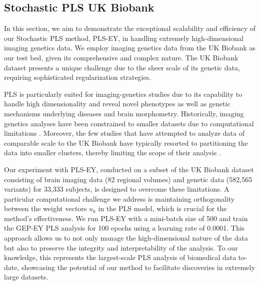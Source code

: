 \subsection{Stochastic PLS UK Biobank}
In this section, we aim to demonstrate the exceptional scalability and efficiency of our Stochastic PLS method, PLS-EY, in handling extremely high-dimensional imaging genetics data.
We employ imaging genetics data from the UK Biobank \citep{sudlow2015uk} as our test bed, given its comprehensive and complex nature.
The UK Biobank dataset presents a unique challenge due to the sheer scale of its genetic data, requiring sophisticated regularization strategies.

PLS is particularly suited for imaging-genetics studies due to its capability to handle high dimensionality and reveal novel phenotypes as well as genetic mechanisms underlying diseases and brain morphometry.
Historically, imaging genetics analyses have been constrained to smaller datasets due to computational limitations \citep{Lorenzi2018,Taquet2021,Lefloch2012}.
Moreover, the few studies that have attempted to analyze data of comparable scale to the UK Biobank have typically resorted to partitioning the data into smaller clusters, thereby limiting the scope of their analysis \citep{lorenzi2017secure, altmann2023tackling}.

Our experiment with PLS-EY, conducted on a subset of the UK Biobank dataset consisting of brain imaging data (82 regional volumes) and genetic data (582,565 variants) for 33,333 subjects, is designed to overcome these limitations.
A particular computational challenge we address is maintaining orthogonality between the weight vectors \( u_k \) in the PLS model, which is crucial for the method's effectiveness.
We run PLS-EY with a mini-batch size of 500 and train the GEP-EY PLS analysis for 100 epochs using a learning rate of 0.0001.
This approach allows us to not only manage the high-dimensional nature of the data but also to preserve the integrity and interpretability of the analysis.
To our knowledge, this represents the largest-scale PLS analysis of biomedical data to-date, showcasing the potential of our method to facilitate discoveries in extremely large datasets.

